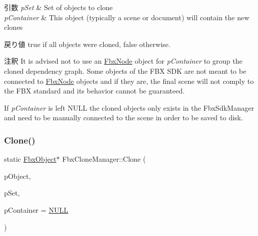 \begin{DoxyParams}{引数}
{\em p\+Set} & Set of objects to clone \\
\hline
{\em p\+Container} & This object (typically a scene or document) will contain the new clones \\
\hline
\end{DoxyParams}
\begin{DoxyReturn}{戻り値}
true if all objects were cloned, false otherwise. 
\end{DoxyReturn}
\begin{DoxyRemark}{注釈}
It is advised not to use an \hyperlink{class_fbx_node}{Fbx\+Node} object for {\itshape p\+Container} to group the cloned dependency graph. Some objects of the F\+BX S\+DK are not meant to be connected to \hyperlink{class_fbx_node}{Fbx\+Node} objects and if they are, the final scene will not comply to the F\+BX standard and its behavior cannot be guaranteed. 

If {\itshape p\+Container} is left {\ttfamily N\+U\+LL} the cloned objects only exists in the Fbx\+Sdk\+Manager and need to be manually connected to the scene in order to be saved to disk. 
\end{DoxyRemark}
\mbox{\label{class_fbx_clone_manager_a00c903de46f38724d4f7fe0d929b9b31}} 
\subsubsection{\texorpdfstring{Clone()}{Clone()}\hspace{0.1cm}{\footnotesize\ttfamily [3/3]}}
{\footnotesize\ttfamily static \hyperlink{class_fbx_object}{Fbx\+Object}$\ast$ Fbx\+Clone\+Manager\+::\+Clone (\begin{DoxyParamCaption}\item[{const \hyperlink{class_fbx_object}{Fbx\+Object} $\ast$}]{p\+Object,  }\item[{\hyperlink{class_fbx_clone_manager_aeb8a9c04c9c36eb7e551186a0b18f10d}{Clone\+Set} $\ast$}]{p\+Set,  }\item[{\hyperlink{class_fbx_object}{Fbx\+Object} $\ast$}]{p\+Container = {\ttfamily \hyperlink{fbxarch_8h_a070d2ce7b6bb7e5c05602aa8c308d0c4}{N\+U\+LL}} }\end{DoxyParamCaption})\hspace{0.3cm}{\ttfamily [static]}}



